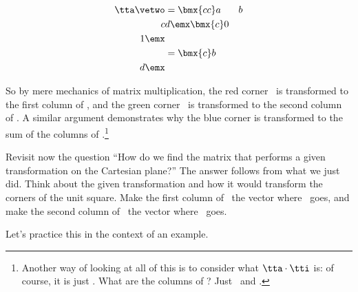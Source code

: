 \begin{align*}
\tta\vetwo &= \bmx{cc}a&b\\c&d\emx\bmx{c}0\\1\emx \\
					&= \bmx{c}b\\d\emx
\end{align*}

So by mere mechanics of matrix multiplication, the red corner \veone\ is transformed to the first column of \tta, and the green corner \vetwo\ is transformed to the second column of \tta. A similar argument demonstrates why the blue corner is transformed to the sum of the columns of \tta.\footnote{Another way of looking at all of this is to consider what $\tta\cdot\tti$ is: of course, it is just \tta. What are the columns of \tti? Just \veone\ and \vetwo.}

Revisit now the question ``How do we find the matrix that performs a given transformation on the Cartesian plane?'' The answer follows from what we just did. Think about the given transformation and how it would transform the corners of the unit square. Make the first column of \tta\ the vector where \veone\ goes, and make the second column of \tta\ the vector where \vetwo\ goes.

Let's practice this in the context of an example.\\

